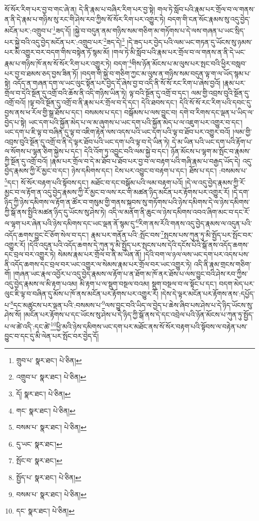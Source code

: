 སོ་སོར་རིག་པར་བྱ་བ་གང་ཞེ་ན། དེ་ནི་རྣམ་པ་བཞིར་རིག་པར་བྱ་སྟེ། གལ་ཏེ་སློབ་པའི་རྣམ་པར་གྲོལ་བ་ལ་གནས་ན་ནི་དེ་རྣམ་པ་གཉིས་སུ་རང་གི་ཤེས་རབ་ཀྱིས་སོ་སོར་རིག་པར་འགྱུར་ཏེ། བདག་གི་ངན་སོང་རྣམས་སུ་འདུ་བྱེད་མངོན་པར་:འགྲུབ་པ་\footnote{གྲུབ་པ་  སྣར་ཐང་།  པེ་ཅིན། }ཟད་དོ། །སྐྱེ་བ་བདུན་ནམ་གཉིས་སམ་གཅིག་མ་གཏོགས་པ་དེ་ལས་གཞན་པ་ཡང་སྲིད་པར་སྐྱེ་བའི་འདུ་བྱེད་མངོན་པར་:འགྲུབ་པར་\footnote{འགྲུབ་པ་  སྣར་ཐང་།  པེ་ཅིན། }ཟད་དེ།\footnote{དོ།  སྣར་ཐང་།  པེ་ཅིན། } །དེ་ཟད་པར་བྱེད་པའི་ལམ་ཡང་གཏན་དུ་ཡོངས་སུ་ཉམས་པར་མི་འགྱུར་བར་བདག་གིས་བསྟེན་ཏོ་སྙམ་མོ། །གལ་ཏེ་མི་སློབ་པའི་རྣམ་པར་གྲོལ་བ་ལ་གནས་ན་ནི་དེ་ཡང་རྣམ་པ་གཉིས་ཁོ་ནས་སོ་སོར་རིག་པར་འགྱུར་ཏེ། བདག་\footnote{གང་  སྣར་ཐང་།  པེ་ཅིན། }གིས་ཉོན་མོངས་པ་མ་ལུས་པར་སྤང་བའི་ཕྱིར་བསླབ་པར་བྱ་བ་ཐམས་ཅད་བྱས་ཟིན་ཏོ། །བདག་གི་སྐྱེ་བ་གཅིག་ཀྱང་མ་ལུས་ན་གཉིས་སམ་བདུན་ལྟ་ག་ལ་ཡོད་སྙམ་པ་སྟེ། འདོད་ན་གཞན་དག་ལ་ཡང་ལུང་སྟོན་པར་བྱེད་དོ་ཞེས་བྱ་བ་འདི་ནི་སོ་སོ་རང་རིག་པ་ཞེས་བྱའོ། །རྣམ་པར་གྲོལ་བ་དེའི་སྔོན་དུ་འགྲོ་བའི་ཆོས་ནི་འདི་གཉིས་ཡིན་ཏེ། ལྟ་བའི་སྔོན་དུ་འགྲོ་བ་དང་། ལམ་གྱི་འབྲས་བུའི་སྔོན་དུ་འགྲོ་བའོ། །ལྟ་བའི་སྔོན་དུ་འགྲོ་བ་ནི་རྣམ་པར་གྲོལ་བ་དེ་དང་། དེའི་ཐབས་དང་། དེའི་སོ་སོ་རང་རིག་པའི་དབང་དུ་བྱས་ནས་ཕ་རོལ་གྱི་སྒྲ་ཐོས་པ་དང་། བསམས་པ་དང་། བསྒོམས་པ་ལས་བྱུང་བ། དགེ་བ་རིགས་དང་ལྡན་པ་ཡིད་ལ་བྱེད་པ་སྟེ། ཡང་དག་པའི་སྐྱོན་མེད་པ་ལ་མ་ཞུགས་པ་ཡང་དག་པའི་སྐྱོན་མེད་པ་ལ་འཇུག་པར་འགྱུར་བ་དང་། ཡང་དག་པ་ཇི་ལྟ་བ་བཞིན་དུ་ལྟ་བ་འཇིག་རྟེན་ལས་འདས་པའི་ཡང་དག་པའི་ལྟ་བ་ཐོབ་པར་འགྱུར་བའོ། །ལམ་གྱི་འབྲས་བུའི་སྔོན་དུ་འགྲོ་བ་ནི་དེ་ལྟར་ཐོབ་པའི་ཡང་དག་པའི་ལྟ་བ་དེ་ཡིན་ཏེ། དེ་མ་ཡིན་པའི་ཡང་དག་པའི་རྟོག་པ་ལ་སོགས་པ་ལྷན་ཅིག་སྐྱེས་པ་དང་། དེའི་འོག་ཏུ་འབྱུང་བའི་ལམ་སྐྱེ་བ་དང་། ཉོན་མོངས་པ་ལྷག་མ་སྤོང་བ་རྣམས་ཀྱི་སྔོན་དུ་འགྲོ་བའོ། །རྣམ་པར་གྲོལ་བ་དེ་མ་ཐོབ་པ་ཐོབ་པར་བྱ་བ་ལ་བརྟག་པའི་གཞི་རྣམ་པ་བརྒྱད་ཡོད་དེ། འདུ་བྱེད་རྣམས་ཀྱི་རོ་མྱང་བ་དང་། ཉེས་དམིགས་དང་། ངེས་པར་འབྱུང་བ་བརྟག་པ་དང་། ཐོས་པ་དང་། :བསམས་པ་\footnote{བསམ་པ་  སྣར་ཐང་།  པེ་ཅིན། }དང་། སོ་སོར་བརྟག་པའི་སྟོབས་དང་། མཐོང་བ་དང་བསྒོམ་པའི་ལམ་བརྟག་པའོ། །དེ་ལ་འདུ་བྱེད་རྣམས་ཀྱི་རོ་མྱང་བ་ལ་རྟོག་ན་འདུ་བྱེད་རྣམས་ཀྱི་རོ་མྱང་བ་ལས་རང་གི་མཚན་ཉིད་མངོན་པར་རྟོགས་པར་འགྱུར་རོ། །དེ་དག་ཉིད་ཀྱི་ཉེས་དམིགས་ལ་རྟོག་ན་ཚོར་བ་གསུམ་གྱི་གནས་སྐབས་སུ་གཏོགས་པའི་ཉེས་དམིགས་དེ་ལ་ཉེས་དམིགས་ཀྱི་སྒོ་ནས་སྤྱིའི་མཚན་ཉིད་དུ་ཡོངས་སུ་ཤེས་ཏེ། འདི་ལ་མནོག་ནི་ཆུང་ལ་ཉེས་དམིགས་འབའ་ཞིག་མང་བ་དང་རོ་ལ་ལྷག་པར་ཞེན་པའི་ཉེས་དམིགས་དང་ཡང་ལྡན་ནོ་སྙམ་དུ་\footnote{དུ་ཡང་  སྣར་ཐང་། }རིག་ནས་རོའི་གནས་འདུ་བྱེད་རྣམས་ལ་འདུན་པའི་འདོད་ཆགས་བྱུང་ངོ་ཅོག་སེལ་བ་དང་། རྣམ་པར་གནོན་པའི་:སྤོང་བས་\footnote{སྤོང་བ་  སྣར་ཐང་། }སྤངས་པས་ཀུན་ཏུ་མི་སྤྱོད་པར་སྤོང་བར་འགྱུར་རོ། །དེའི་འདུན་པའི་འདོད་ཆགས་དེ་ཀུན་ཏུ་མི་སྤྱོད་པར་སྤངས་པས་དེའི་དངོས་པོའི་སྒོ་ནས་འདོད་ཆགས་དང་བྲལ་བར་འགྱུར་ཏེ། སེམས་རྣམ་པར་གྲོལ་བ་ནི་མ་ཡིན་ནོ། །དེའི་བག་ལ་ཉལ་ལས་ཡང་དག་པར་འདས་པས་ནི་འདོད་ཆགས་དང་བྲལ་བར་ཡང་འགྱུར་ལ་སེམས་རྣམ་པར་གྲོལ་བར་ཡང་འགྱུར་ཏེ། འདི་ནི་རྣམ་གྲངས་གཅིག་གོ། །གཞན་ཡང་རྣལ་འབྱོར་པ་འདུ་བྱེད་རྣམས་ལ་རྟོག་པ་ན་ཐོག་མ་ཁོ་ནར་ཐོས་པ་ལས་བྱུང་བའི་ཤེས་རབ་ཀྱིས་འདུ་བྱེད་རྣམས་ལ་མི་རྟག་པའམ། མི་རྟག་པ་ལ་སྡུག་བསྔལ་བའམ། སྡུག་བསྔལ་བ་ལ་སྟོང་པ་དང་། བདག་མེད་པར་ལུང་ཇི་ལྟ་བ་བཞིན་དུ་མོས་པ་ཁོ་ནས་མངོན་པར་རྟོགས་པར་འགྱུར་རོ། །དེས་དེ་ལྟར་མངོན་པར་རྟོགས་ནས་:དཔྱོད་པ་\footnote{སྤྱོད་པ་  སྣར་ཐང་།  པེ་ཅིན། }དང་མཚུངས་པར་ལྡན་པའི་:བསམས་པ་\footnote{བསམ་པ་  སྣར་ཐང་།  པེ་ཅིན། }ལས་བྱུང་བའི་ཡིད་ལ་བྱེད་པ་ཆེས་ཞིབ་པས་ཤེས་པ་དེ་ཉིད་ཡོངས་སུ་ཤེས་སོ། །མངོན་པར་རྟོགས་པ་དང་ཡོངས་སུ་ཤེས་པ་དེ་ཉིད་ཀྱི་སྒོ་ནས་དེ་དང་འབྲེལ་པའི་ཉོན་མོངས་པ་ཀུན་ཏུ་སྤྱོད་པ་ལ་ཚེ་འདི་:དང་ཚེ་\footnote{དང་  སྣར་ཐང་།  པེ་ཅིན། }ཕྱི་མའི་ཉེས་དམིགས་ཡང་དག་པར་མཐོང་ནས་སོ་སོར་བརྟག་པའི་སྟོབས་ལ་བརྟེན་པས་བྱུང་བ་དང་དུ་མི་ལེན་པར་སྤོང་བར་བྱེད་དོ། 